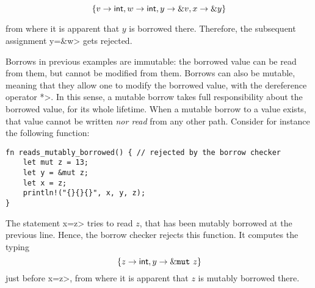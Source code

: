 \[
\{v\to\mathsf{int},w\to\mathsf{int},y\to\& v,x\to\& y\}
\]

\noindent
from where it is apparent that $y$ is borrowed there. Therefore,
the subsequent assignment \<y=\&w> gets rejected.

Borrows in previous examples are immutable: the borrowed value can be read
from them, but cannot be modified from them.
Borrows can also be mutable, meaning that they allow one to modify the
borrowed value, with the dereference operator \<*>. In this sense,
a mutable borrow takes full responsibility about the borrowed value, for its
whole lifetime. When a mutable borrow to a value exists, that value cannot
be written \emph{nor read} from any other path. Consider for instance
the following function:

\begin{lstlisting}
fn reads_mutably_borrowed() { // rejected by the borrow checker
    let mut z = 13;
    let y = &mut z;
    let x = z;
    println!("{}{}{}", x, y, z);
}
\end{lstlisting}

\noindent
The statement \<x=z> tries to read $z$, that has been mutably borrowed
at the previous line. Hence, the borrow checker rejects this function.
It computes the typing
\[
\{z\to\mathsf{int},y\to\&\mathtt{mut}\  z\}
\]
just before \<x=z>, from where it is apparent that $z$ is mutably borrowed there.

%
%

%
%
